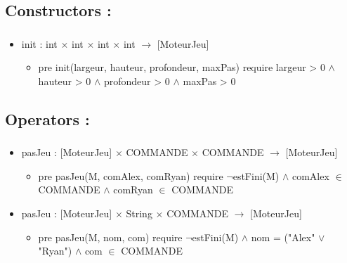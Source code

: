 \documentclass[11pt]{article}
\begin{document}
\subsection{Constructors :}
\label{sec-1.5}

\subsubsection{}

\begin{itemize}

\item init : int $\times$ int $\times$ int $\times$ int $\to$ [MoteurJeu]\\
\label{sec-1.5.1.1}

\begin{itemize}

\item pre init(largeur, hauteur, profondeur, maxPas) require largeur > 0 $\wedge$ hauteur > 0 $\wedge$ profondeur > 0 $\wedge$ maxPas > 0\\
\label{sec-1.5.1.1.1}


\end{itemize} %
\end{itemize} %
\subsection{Operators :}
\label{sec-1.6}

\subsubsection{}

\begin{itemize}

\item pasJeu : [MoteurJeu] $\times$ COMMANDE $\times$ COMMANDE $\to$ [MoteurJeu]\\
\label{sec-1.6.1.1}

\begin{itemize}

\item pre pasJeu(M, comAlex, comRyan) require $\neg$estFini(M) $\wedge$ comAlex $\in$ COMMANDE $\wedge$ comRyan $\in$ COMMANDE\\
\label{sec-1.6.1.1.1}


\end{itemize} %

\item pasJeu : [MoteurJeu] $\times$ String $\times$ COMMANDE $\to$ [MoteurJeu]\\
\label{sec-1.6.1.2}

\begin{itemize}

\item pre pasJeu(M, nom, com) require $\neg$estFini(M) $\wedge$ nom = ("Alex" $\vee$ "Ryan") $\wedge$ com $\in$ COMMANDE\\
\label{sec-1.6.1.2.1}





\end{itemize} %
\end{itemize} %
\end{document}
